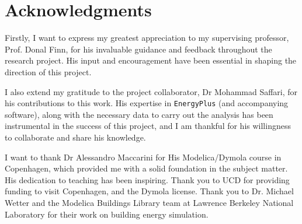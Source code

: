


\bigskip

\begingroup
\let\clearpage\relax
\let\cleardoublepage\relax
\let\cleardoublepage\relax
\chapter*{Acknowledgments}
Firstly, I want to express my greatest appreciation to my supervising professor, Prof. Donal Finn, for his invaluable guidance and feedback throughout the research project. His input and encouragement have been essential in shaping the direction of this project.

I also extend my gratitude to the project collaborator, Dr Mohammad Saffari, for his contributions to this work. His expertise in \texttt{EnergyPlus} (and accompanying software), along with the necessary data to carry out the analysis has been instrumental in the success of this project, and I am thankful for his willingness to collaborate and share his knowledge.

I want to thank Dr Alessandro Maccarini for His Modelica/Dymola course in Copenhagen, which provided me with a solid foundation in the subject matter. His dedication to teaching has been inspiring. Thank you to UCD for providing funding to visit Copenhagen, and the Dymola license. Thank you to Dr. Michael Wetter and the Modelica Buildings Library team at Lawrence Berkeley National Laboratory for their work on building energy simulation. 


